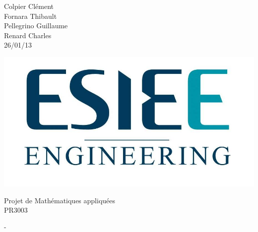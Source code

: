 \documentclass[10pt,a4paper]{article}
\begin{document}


\begin{minipage}{0.5\linewidth} %
Colpier Clément\\
Fornara Thibault\\
Pellegrino Guillaume\\
Renard Charles\\



26/01/13
\end{minipage}
\begin{minipage}{0.5\linewidth}
\begin{flushright}
\includegraphics[scale=0.2]{logo-esiee.jpg}

\end{flushright}
\end{minipage}


\vspace{8cm}

\begin{center}
\LARGE Projet de Mathématiques appliquées \\
\-
\LARGE PR3003
\\

\end{center}




\newpage
-
\newpage
\tableofcontents              %
\clearpage
\end{document}
